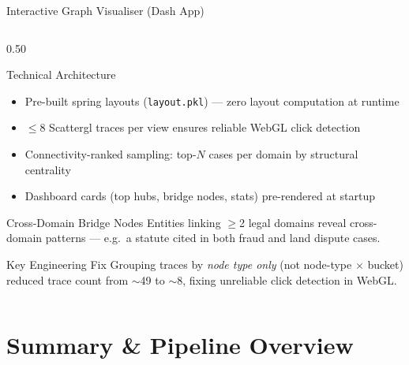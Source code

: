 \documentclass[aspectratio=169, 9pt]{beamer}
\begin{document}
\begin{frame}{Interactive Graph Visualiser (Dash App)}
\begin{columns}[T]
\begin{column}{0.50\textwidth}
\begin{block}{Technical Architecture}
\begin{itemize}
          \item Pre-built spring layouts (\texttt{layout.pkl}) — zero layout computation at runtime
          \item $\leq$8 Scattergl traces per view ensures reliable WebGL click detection
          \item Connectivity-ranked sampling: top-$N$ cases per domain by structural centrality
          \item Dashboard cards (top hubs, bridge nodes, stats) pre-rendered at startup
        \end{itemize}
      \end{block}
      \vspace{5pt}
      \begin{alertblock}{Cross-Domain Bridge Nodes}
        \small Entities linking $\geq$2 legal domains reveal cross-domain patterns — e.g.\ a statute cited in both fraud and land dispute cases.
      \end{alertblock}
      \vspace{5pt}
      \begin{block}{Key Engineering Fix}
        \scriptsize Grouping traces by \emph{node type only} (not node-type $\times$ bucket) reduced trace count from $\sim$49 to $\sim$8, fixing unreliable click detection in WebGL.
      \end{block}
    \end{column}
  \end{columns}
\end{frame}

\section{Summary \& Pipeline Overview}
\end{document}
